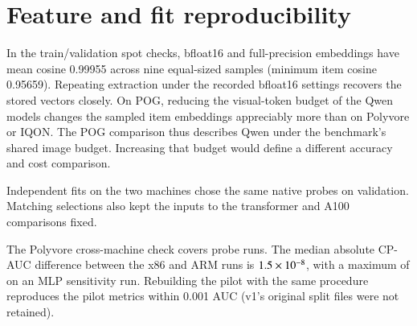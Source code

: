 \documentclass[preprint,12pt]{elsarticle}
\begin{document}
\section{Feature and fit reproducibility}\label{sec:reproduction}
In the train/validation spot checks, bfloat16 and full-precision embeddings have mean cosine 0.99955 across nine equal-sized samples (minimum item cosine 0.95659). Repeating extraction under the recorded bfloat16 settings recovers the stored vectors closely. On POG, reducing the visual-token budget of the Qwen models changes the sampled item embeddings appreciably more than on Polyvore or IQON. The POG comparison thus describes Qwen under the benchmark's shared image budget. Increasing that budget would define a different accuracy and cost comparison.

Independent fits on the two machines chose the same native probes on validation. Matching selections also kept the inputs to the transformer and A100 comparisons fixed.

The Polyvore cross-machine check covers \resCrossMachineFiles{} probe runs. The median absolute CP-AUC difference between the x86 and ARM runs is $1.5\times10^{-8}$, with a maximum of \resCrossMachineMaxAbsDaucFixed{} on an MLP sensitivity run.
Rebuilding the pilot with the same procedure reproduces the pilot metrics within 0.001 AUC (v1's original split files were not retained).
\end{document}
